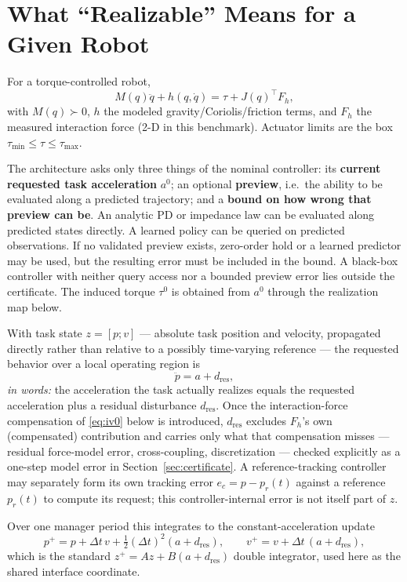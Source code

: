 \documentclass[journal]{IEEEtran}
\begin{document}
\section{What ``Realizable'' Means for a Given Robot}
\label{sec:realizable}

For a torque-controlled robot,
\[
M(q)\ddot q+h(q,\dot q)=\tau+J(q)^\top F_h,
\]
with $M(q)\succ0$, $h$ the modeled gravity/Coriolis/friction terms, and $F_h$ the measured interaction force (2-D in this benchmark). Actuator limits are the box $\tau_{\min}\le\tau\le\tau_{\max}$.

The architecture asks only three things of the nominal controller: its \textbf{current requested task acceleration} $a^0$; an optional \textbf{preview}, i.e.\ the ability to be evaluated along a predicted trajectory; and a \textbf{bound on how wrong that preview can be}. An analytic PD or impedance law can be evaluated along predicted states directly. A learned policy can be queried on predicted observations. If no validated preview exists, zero-order hold or a learned predictor may be used, but the resulting error must be included in the bound. A black-box controller with neither query access nor a bounded preview error lies outside the certificate. The induced torque $\tau^0$ is obtained from $a^0$ through the realization map below.

With task state $z=[p;v]$ --- absolute task position and velocity, propagated directly rather than relative to a possibly time-varying reference --- the requested behavior over a local operating region is
\[
\ddot p=a+d_{\mathrm{res}},
\]
\emph{in words:} the acceleration the task actually realizes equals the requested acceleration plus a residual disturbance $d_{\mathrm{res}}$. Once the interaction-force compensation of \eqref{eq:iv0} below is introduced, $d_{\mathrm{res}}$ excludes $F_h$'s own (compensated) contribution and carries only what that compensation misses --- residual force-model error, cross-coupling, discretization --- checked explicitly as a one-step model error in Section~\ref{sec:certificate}. A reference-tracking controller may separately form its own tracking error $e_c=p-p_r(t)$ against a reference $p_r(t)$ to compute its request; this controller-internal error is not itself part of $z$.

Over one manager period this integrates to the constant-acceleration update
\[
p^{+}=p+\Delta t\,v+\tfrac12(\Delta t)^2(a+d_{\mathrm{res}}),
\qquad
v^{+}=v+\Delta t\,(a+d_{\mathrm{res}}),
\]
which is the standard $z^{+}=Az+B(a+d_{\mathrm{res}})$ double integrator, used here as the shared interface coordinate.
\end{document}
